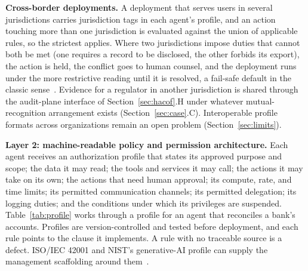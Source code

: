 \documentclass[journal]{IEEEtran}
\begin{document}
\textbf{Cross-border deployments.} A deployment that serves users in several jurisdictions carries jurisdiction tags in each agent's profile, and an action touching more than one jurisdiction is evaluated against the union of applicable rules, so the strictest applies. Where two jurisdictions impose duties that cannot both be met (one requires a record to be disclosed, the other forbids its export), the action is held, the conflict goes to human counsel, and the deployment runs under the more restrictive reading until it is resolved, a fail-safe default in the classic sense~\cite{saltzer1975protection}.
Evidence for a regulator in another jurisdiction is shared through the audit-plane interface of Section~\ref{sec:hacof}.H under whatever mutual-recognition arrangement exists (Section~\ref{sec:case}.C). Interoperable profile formats across organizations remain an open problem (Section~\ref{sec:limits}).

\textbf{Layer 2: machine-readable policy and permission architecture.} Each agent receives an authorization profile that states its approved purpose and scope; the data it may read; the tools and services it may call; the actions it may take on its own; the actions that need human approval; its compute, rate, and time limits; its permitted communication channels; its permitted delegation; its logging duties; and the conditions under which its privileges are suspended. Table~\ref{tab:profile} works through a profile for an agent that reconciles a bank's accounts. Profiles are version-controlled and tested before deployment, and each rule points to the clause it implements. A rule with no traceable source is a defect. ISO/IEC 42001 and NIST's generative-AI profile can supply the management scaffolding around them~\cite{iso2023iso42001,nist2024genai}.
\end{document}
